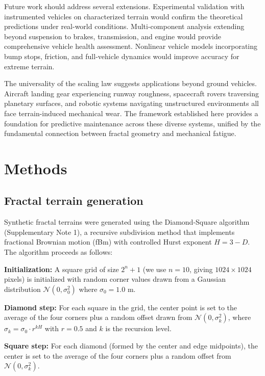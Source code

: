 \documentclass[11pt]{article}
\begin{document}
Future work should address several extensions. Experimental validation with instrumented vehicles on characterized terrain would confirm the theoretical predictions under real-world conditions. Multi-component analysis extending beyond suspension to brakes, transmission, and engine would provide comprehensive vehicle health assessment. Nonlinear vehicle models incorporating bump stops, friction, and full-vehicle dynamics would improve accuracy for extreme terrain.

The universality of the scaling law suggests applications beyond ground vehicles. Aircraft landing gear experiencing runway roughness, spacecraft rovers traversing planetary surfaces, and robotic systems navigating unstructured environments all face terrain-induced mechanical wear. The framework established here provides a foundation for predictive maintenance across these diverse systems, unified by the fundamental connection between fractal geometry and mechanical fatigue.


\section*{Methods}

\subsection*{Fractal terrain generation}

Synthetic fractal terrains were generated using the Diamond-Square algorithm\cite{Voss1985} (Supplementary Note 1), a recursive subdivision method that implements fractional Brownian motion (fBm) with controlled Hurst exponent $H = 3-D$. The algorithm proceeds as follows:

\textbf{Initialization:} A square grid of size $2^n + 1$ (we use $n = 10$, giving $1024 \times 1024$ pixels) is initialized with random corner values drawn from a Gaussian distribution $\mathcal{N}(0, \sigma_0^2)$ where $\sigma_0 = 1.0$ m.

\textbf{Diamond step:} For each square in the grid, the center point is set to the average of the four corners plus a random offset drawn from $\mathcal{N}(0, \sigma_k^2)$, where $\sigma_k = \sigma_0 \cdot r^{kH}$ with $r = 0.5$ and $k$ is the recursion level.

\textbf{Square step:} For each diamond (formed by the center and edge midpoints), the center is set to the average of the four corners plus a random offset from $\mathcal{N}(0, \sigma_k^2)$.
\end{document}
